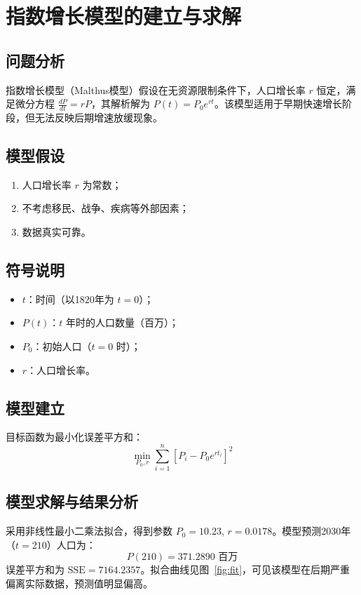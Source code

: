 \documentclass[12pt]{ctexart}
\begin{document}
\section{指数增长模型的建立与求解}
\subsection{问题分析}
指数增长模型（Malthus模型）假设在无资源限制条件下，人口增长率 $r$ 恒定，满足微分方程 $\frac{dP}{dt} = rP$，其解析解为 $P(t) = P_0 e^{rt}$。该模型适用于早期快速增长阶段，但无法反映后期增速放缓现象。

\subsection{模型假设}
\begin{enumerate}
    \item 人口增长率 $r$ 为常数；
    \item 不考虑移民、战争、疾病等外部因素；
    \item 数据真实可靠。
\end{enumerate}

\subsection{符号说明}
\begin{itemize}
    \item $t$：时间（以1820年为 $t=0$）；
    \item $P(t)$：$t$ 年时的人口数量（百万）；
    \item $P_0$：初始人口（$t=0$ 时）；
    \item $r$：人口增长率。
\end{itemize}

\subsection{模型建立}
目标函数为最小化误差平方和：
\[
\min_{P_0, r} \sum_{i=1}^{n} \left[ P_i - P_0 e^{r t_i} \right]^2
\]

\subsection{模型求解与结果分析}
采用非线性最小二乘法拟合，得到参数 $P_0 = 10.23$, $r = 0.0178$。模型预测2030年（$t=210$）人口为：
\[
P(210) = 371.2890 \text{ 百万}
\]
误差平方和为 $\mathrm{SSE} = 7164.2357$。拟合曲线见图~\ref{fig:fit}，可见该模型在后期严重偏离实际数据，预测值明显偏高。
\end{document}
